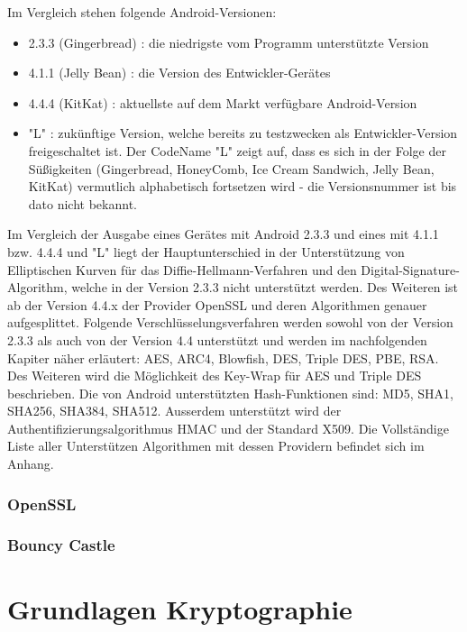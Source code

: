 \documentclass[10pt, a4paper]{scrreprt}
\begin{document}
Im Vergleich stehen folgende Android-Versionen:
\begin{itemize}
\item 2.3.3 (Gingerbread) : die niedrigste vom Programm unterstützte Version
\item 4.1.1 (Jelly Bean) : die Version des Entwickler-Gerätes
\item 4.4.4 (KitKat) : aktuellste auf dem Markt verfügbare Android-Version
\item "L" : zukünftige Version, welche bereits zu testzwecken als Entwickler-Version freigeschaltet ist. Der CodeName "L" zeigt auf, dass es sich in der Folge der Süßigkeiten (Gingerbread, HoneyComb, Ice Cream Sandwich, Jelly Bean, KitKat) vermutlich alphabetisch fortsetzen wird - die Versionsnummer ist bis dato nicht bekannt.
\end{itemize}
Im Vergleich der Ausgabe eines Gerätes mit Android 2.3.3 und eines mit 4.1.1 bzw. 4.4.4 und "L" liegt der Hauptunterschied in der Unterstützung von Elliptischen Kurven für das Diffie-Hellmann-Verfahren und den Digital-Signature-Algorithm, welche in der Version 2.3.3 nicht unterstützt werden. Des Weiteren ist ab der Version 4.4.x der Provider OpenSSL und deren Algorithmen genauer aufgesplittet.
Folgende Verschlüsselungsverfahren werden sowohl von der Version 2.3.3 als auch von der Version 4.4 unterstützt und werden im nachfolgenden Kapiter näher erläutert: AES, ARC4, Blowfish, DES, Triple DES, PBE, RSA. Des Weiteren wird die Möglichkeit des Key-Wrap für AES und Triple DES beschrieben. Die von Android unterstützten Hash-Funktionen sind: MD5, SHA1, SHA256, SHA384, SHA512. Ausserdem unterstützt wird der Authentifizierungsalgorithmus HMAC und der Standard X509. Die Vollständige Liste aller Unterstützen Algorithmen mit dessen Providern befindet sich im Anhang.


\subsection{OpenSSL}
\subsection{Bouncy Castle}

\chapter{Grundlagen Kryptographie}
\end{document}
